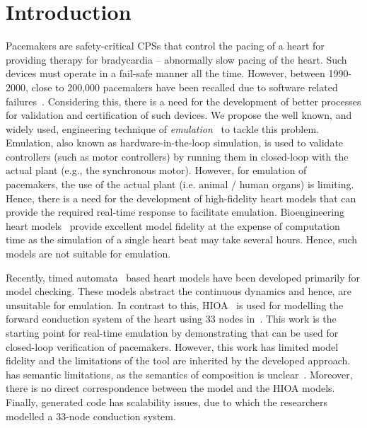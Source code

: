 \section{Introduction}

Pacemakers are safety-critical \acp{CPS} that control the pacing of a
heart for providing therapy for bradycardia -- abnormally slow pacing of
the heart.  Such devices must operate in a fail-safe manner all the
time. However, between 1990-2000, close to 200,000 pacemakers have been
recalled due to software related
failures~\cite{alemzadeh13}. Considering this, there is a need for the
development of better processes for validation and certification of such
devices. We propose the well known, and widely used, engineering
technique of \emph{emulation}~\cite{patel2015survey} to tackle this
problem. Emulation, also known as hardware-in-the-loop simulation, is
used to validate controllers (such as motor controllers) by running them
in closed-loop with the actual plant (e.g., the synchronous motor).
However, for emulation of pacemakers, the use of the actual plant
(i.e. animal / human organs) is limiting.  Hence, there is a need for
the development of high-fidelity heart models that can provide the
required real-time response to facilitate emulation. Bioengineering
heart models~\cite{Trayanova2014} provide excellent model fidelity at
the expense of computation time as the simulation of a single heart beat
may take several hours. Hence, such models are not suitable for
emulation.

Recently, timed automata~\cite{zhihao12} based heart models have been
developed primarily for model checking. These models abstract the
continuous dynamics and hence, are unsuitable for emulation.  In
contrast to this, \acf{HIOA}~\cite{alur2015principles, raskin05} is used
for modelling the forward conduction system of the heart using 33 nodes
in~\cite{chen14}. This work is the starting point for real-time
emulation by demonstrating that \simulink can be used for closed-loop
verification of pacemakers. However, this work has limited model
fidelity and the limitations of the tool \simulink are inherited by the
developed approach.  \simulink has semantic limitations, as the
semantics of composition is unclear~\cite{need-some-ref}.  Moreover,
there is no direct correspondence between the \simulink model and the
\ac{HIOA} models. Finally, \simulink generated code has scalability
issues, due to which the researchers modelled a 33-node conduction
system.


